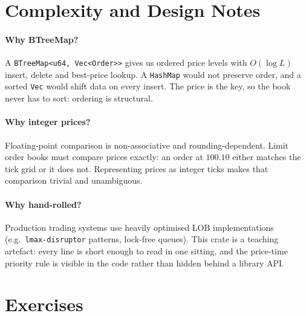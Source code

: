 \section{Complexity and Design Notes}

\paragraph{Why BTreeMap?} A \texttt{BTreeMap<u64, Vec<Order>>} gives
us ordered price levels with $O(\log L)$ insert, delete and best-price
lookup. A \texttt{HashMap} would not preserve order, and a sorted
\texttt{Vec} would shift data on every insert. The price is the key,
so the book never has to sort: ordering is structural.

\paragraph{Why integer prices?} Floating-point comparison is
non-associative and rounding-dependent. Limit order books must compare
prices exactly: an order at $100.10$ either matches the tick grid or
it does not. Representing prices as integer ticks makes that comparison
trivial and unambiguous.

\paragraph{Why hand-rolled?} Production trading systems use heavily
optimised LOB implementations (e.g.\ \texttt{lmax-disruptor} patterns,
lock-free queues). This crate is a teaching artefact: every line is
short enough to read in one sitting, and the price-time priority rule
is visible in the code rather than hidden behind a library API.

\section{Exercises}


